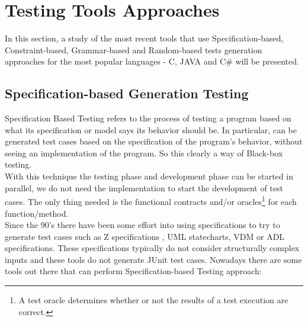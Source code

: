 \section{Testing Tools Approaches}\label{testingapproaches}
In this section, a study of the most recent tools that use Specification-based, Constraint-based, Grammar-based and Random-based tests generation
approaches for the most popular languages - C, JAVA and C\# will be presented.

\subsection{Specification-based Generation Testing}
Specification Based Testing refers to the process of testing a program based on what its specification or model says its behavior should be.
In particular, can be generated test cases based on the specification of the program's behavior, without seeing an implementation of the program. So this clearly a
way of Black-box testing.\\
With this technique the testing phase and development phase can be started in parallel, we do not need the implementation
to start the development of test cases. The only thing needed is the functional contracts and/or oracles\footnote{A test oracle determines whether or not the results of a test execution are correct\cite{Peters95generatinga}.} for each function/method.\\
Since the 90's there have been some effort into using specifications to try to generate test cases such as Z specifications
\cite{Horcher95improvingsoftware,Stocks:1996:FST:239916.239918}, \ac{UML} statecharts\cite{Offutt:1999:GTU:1767297.1767341}, \ac{VDM}\cite{Aichernig99automatedblack-box}
or \ac{ADL} specifications\cite{Sankar94specifyingand}.
These specifications typically do not consider structurally complex inputs and these tools do not generate JUnit test cases.
Nowadays there are some tools out there that can perform Specification-based Testing approach:

